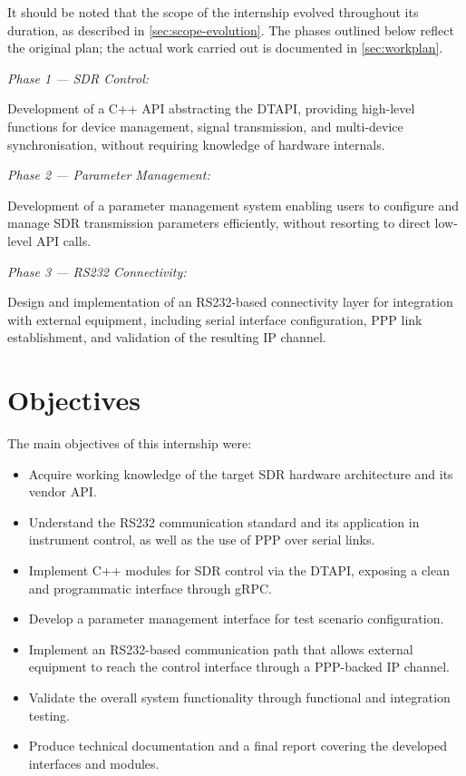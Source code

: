 It should be noted that the scope of the internship evolved throughout its
duration, as described in \autoref{sec:scope-evolution}. The phases outlined
below reflect the original plan; the actual work carried out is documented in
\autoref{sec:workplan}.

\emph{Phase 1 --- \gls{SDR} Control:}

Development of a C++ API abstracting the \gls{DTAPI}, providing high-level
functions for device management, signal transmission, and multi-device
synchronisation, without requiring knowledge of hardware internals.

\emph{Phase 2 --- Parameter Management:}

Development of a parameter management system enabling users to configure and
manage \gls{SDR} transmission parameters efficiently, without resorting to
direct low-level API calls.

\emph{Phase 3 --- \gls{RS232} Connectivity:}

Design and implementation of an \gls{RS232}-based connectivity layer for
integration with external equipment, including serial interface configuration,
\gls{PPP} link establishment, and validation of the resulting IP channel.

\section{Objectives}

The main objectives of this internship were:

\begin{itemize}
      \item Acquire working knowledge of the target \gls{SDR} hardware architecture and its
            vendor API.
      \item Understand the \gls{RS232} communication standard and its application in
            instrument control, as well as the use of \gls{PPP} over serial
            links.
      \item Implement C++ modules for \gls{SDR} control via the \gls{DTAPI}, exposing a
            clean and programmatic interface through \gls{gRPC}.
      \item Develop a parameter management interface for test scenario configuration.
      \item Implement an \gls{RS232}-based communication path that allows
            external equipment to reach the control interface through a
            \gls{PPP}-backed IP channel.
      \item Validate the overall system functionality through functional and integration
            testing.
      \item Produce technical documentation and a final report covering the developed
            interfaces and modules.
\end{itemize}

